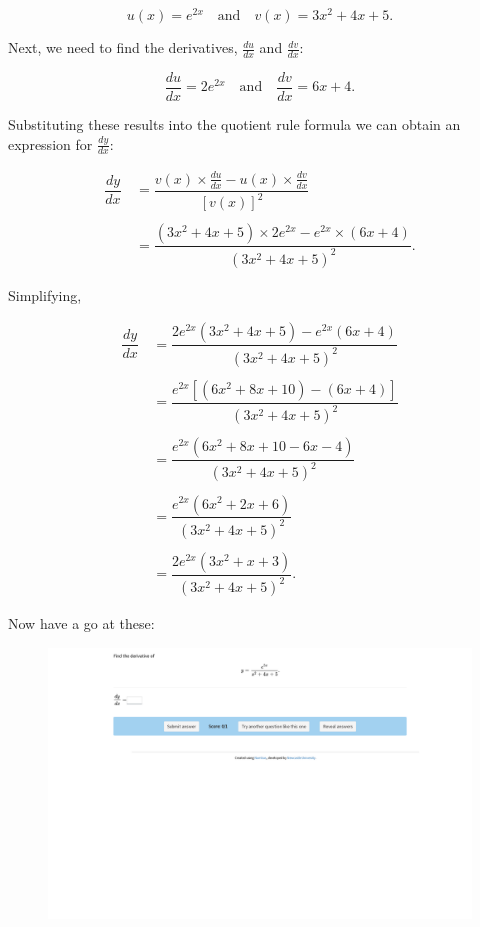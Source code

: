 \documentclass[
  a4paper,
]{scrbook}
\begin{document}
\[
u(x) = e^{2x} \quad \text{and} \quad v(x)=3x^2+4x+5.
\]

Next, we need to find the derivatives, \(\tfrac{du}{dx}\) and
\(\tfrac{dv}{dx}\):

\[
\dfrac{du}{dx} = 2e^{2x} \quad \text{and} \quad \dfrac{dv}{dx} = 6x+4.
\]

Substituting these results into the quotient rule formula we can obtain
an expression for \(\tfrac{dy}{dx}\):

\[
\begin{aligned}
\dfrac{dy}{dx} &\,= \dfrac{v(x) \times \frac{du}{dx} - u(x) \times\frac{dv}{dx}}{[v(x)]^2} \\ \\
&\,=\dfrac{(3x^2+4x+5) \times 2e^{2x} - e^{2x} \times (6x+4)}{(3x^2+4x+5)^2}.
\end{aligned}
\]

Simplifying,

\[
\begin{aligned}
\dfrac{dy}{dx} &\,=\dfrac{2e^{2x}(3x^2+4x+5) - e^{2x}(6x+4)}{(3x^2+4x+5)^2} \\ \\
&\,=\dfrac{e^{2x}[(6x^2+8x+10) - (6x+4)]}{(3x^2+4x+5)^2} \\ \\
&\,=\dfrac{e^{2x}(6x^2+8x+10 - 6x - 4)}{(3x^2+4x+5)^2} \\ \\
&\,=\dfrac{e^{2x}(6x^2+2x+6)}{(3x^2+4x+5)^2} \\ \\
&\,=\dfrac{2e^{2x}(3x^2+x+3)}{(3x^2+4x+5)^2}.
\end{aligned}
\]

Now have a go at these:

\begin{figure}

{\centering 

\href{https://numbas.mathcentre.ac.uk/question/67315/differentiation-quotient-rule-4/embed/?token=bce25b63-b091-4e64-811d-5e064743c9d4}{\includegraphics{./12-further-differentiation_files/figure-pdf/unnamed-chunk-4-1.png}}

}

\end{figure}


\backmatter
\end{document}
